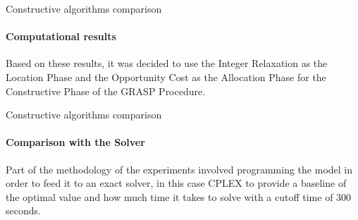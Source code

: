 \documentclass{beamer}
\begin{document}
\begin{frame}{Constructive algorithms comparison}
    \framesubtitle{Computational results}
    \begin{table}
        \centering
        \caption{Summary of the experiment results}
        \label{tab:constructive_exp}
    \end{table}
    
    Based on these results, it was decided to use the Integer Relaxation as the Location Phase and the Opportunity Cost as the Allocation Phase for the Constructive Phase of the GRASP Procedure.
\end{frame}
\begin{frame}{Constructive algorithms comparison}
    \framesubtitle{Comparison with the Solver}
    \begin{table}
        \centering
        \caption{Summary of the experiment results}
        \label{tab:constructive_optim_comp}
    \end{table}
    Part of the methodology of the experiments involved programming the model in order to feed it to an exact solver, in this case CPLEX to provide a baseline of the optimal value and how much time it takes to solve with a cutoff time of 300 seconds.
\end{frame}
\end{document}
